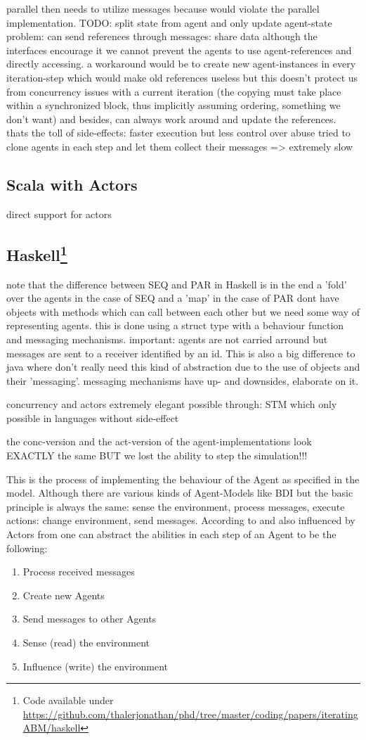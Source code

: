 parallel then needs to utilize messages because would violate the parallel implementation. TODO: split state from agent and only update agent-state
problem: can send references through messages: share data
although the interfaces encourage it we cannot prevent the agents to use agent-references and directly accessing. a workaround would be to create new agent-instances in every iteration-step which would make old references useless but this doesn't protect us from concurrency issues with a current iteration (the copying must take place within a synchronized block, thus implicitly assuming ordering, something we don't want) and besides, can always work around and update the references.
thats the toll of side-effects: faster execution but less control over abuse
tried to clone agents in each step and let them collect their messages => extremely slow

\subsection{Scala with Actors}
direct support for actors

\subsection[Haskell]{Haskell\footnote{Code available under\\ \url{https://github.com/thalerjonathan/phd/tree/master/coding/papers/iteratingABM/haskell}}}
note that the difference between SEQ and PAR in Haskell is in the end a 'fold' over the agents in the case of SEQ and a 'map' in the case of PAR
dont have objects with methods which can call between each other but we need some way of representing agents. this is done using a struct type with a behaviour function and messaging mechanisms. important: agents are not carried arround but messages are sent to a receiver identified by an id. This is also a big difference to java where don't really need this kind of abstraction due to the use of objects and their 'messaging'. messaging mechanisms have up- and downsides, elaborate on it.

concurrency and actors extremely elegant possible through: STM which only possible in languages without side-effect	

the conc-version and the act-version of the agent-implementations look EXACTLY the same	 BUT we lost the ability to step the simulation!!!

This is the process of implementing the behaviour of the Agent as specified in the model. Although there are various kinds of Agent-Models like BDI but the basic principle is always the same: sense the environment, process messages, execute actions: change environment, send messages. According to \cite{wooldridge_introduction_2009} and also influenced by Actors from \cite{agha_actors:_1986} one can abstract the abilities in each step of an Agent to be the following:

\begin{enumerate}
\item Process received messages
\item Create new Agents
\item Send messages to other Agents
\item Sense (read) the environment
\item Influence (write) the environment
\end{enumerate}
